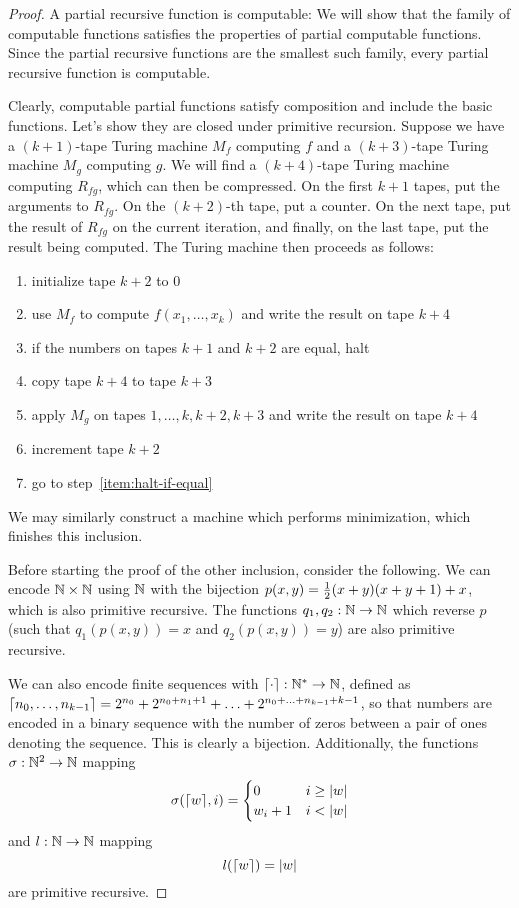 \begin{proof}
  A partial recursive function is computable:
  We will show that the family of computable functions satisfies the properties
  of partial computable functions.
  Since the partial recursive functions are the smallest such family, every
  partial recursive function is computable.

  Clearly, computable partial functions satisfy composition and include the
  basic functions.
  Let's show they are closed under primitive recursion.
  Suppose we have a $(k+1)$-tape Turing machine $M_f$ computing $f$ and a
  $(k+3)$-tape Turing machine $M_g$ computing $g$.
  We will find a $(k+4)$-tape Turing machine computing $R_{fg}$, which can then
  be compressed.
  On the first $k+1$ tapes, put the arguments to $R_{fg}$.
  On the $(k+2)$-th tape, put a counter.
  On the next tape, put the result of $R_{fg}$ on the current iteration, and
  finally, on the last tape, put the result being computed.
  The Turing machine then proceeds as follows:
  \begin{enumerate}
  \item initialize tape $k+2$ to $0$
  \item use $M_f$ to compute $f(x_1, \ldots, x_k)$ and write the result on tape
	$k+4$
  \item \label{item:halt-if-equal} if the numbers on tapes $k+1$ and $k+2$ are equal, halt
  \item copy tape $k+4$ to tape $k+3$
  \item apply $M_g$ on tapes $1, \ldots, k, k+2, k+3$ and write the result on
	tape $k+4$
  \item increment tape $k+2$
  \item go to step~\ref{item:halt-if-equal}
  \end{enumerate}
  We may similarly construct a machine which performs minimization, which
  finishes this inclusion.

  Before starting the proof of the other inclusion, consider the following.
  We can encode $\mathbb{N} \times \mathbb{N}$ using $\mathbb{N}$ with the bijection $p(x,y) = \frac{1}{2}
  (x+y)(x+y+1) + x$, which is also primitive recursive.
  The functions $q_1, q_2: \mathbb{N} \to \mathbb{N}$ which reverse $p$ (such that $q_1(p(x,y))
  = x$ and $q_2(p(x,y)) = y$) are also primitive recursive.

  We can also encode finite sequences with $\lceil \cdot \rceil : \mathbb{N}^* \to \mathbb{N}$, defined
  as $\lceil n_0, \ldots, n_{k-1} \rceil = 2^{n_0} + 2^{n_0 + n_1 + 1} + \ldots +
  2^{n_0 + \ldots + n_{k-1} + k-1}$, so that numbers are encoded in a binary
  sequence with the number of zeros between a pair of ones denoting the
  sequence.
  This is clearly a bijection.
  Additionally, the functions $\sigma: \mathbb{N}^2 \to \mathbb{N}$ mapping
  \[
	\sigma(\lceil w \rceil, i) =
	\begin{cases}
	  0 & i \ge \left| w \right| \\
	  w_i+1 & i < \left| w \right|
	\end{cases}
  \]
  and $l: \mathbb{N} \to \mathbb{N}$ mapping
  \[
	l(\lceil w \rceil) = \left| w \right|
  \]
  are primitive recursive.


\end{proof}
